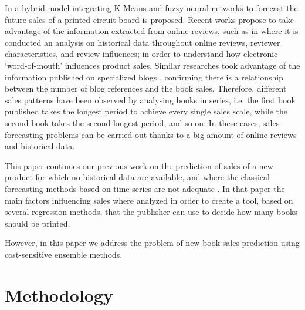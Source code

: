 \documentclass[a4paper,10pt,onecolumn,preprint,3p]{elsarticle}
\begin{document}
In \cite{Chang2009} a hybrid model integrating K-Means and fuzzy neural networks 
to forecast the future sales of a printed circuit board is proposed.
Recent works propose to take advantage of the information extracted from online reviews, such as in \cite{ChernWSF15} where it is conducted an analysis on historical data throughout online reviews, reviewer characteristics, and review influences; in order to understand how electronic `word-of-mouth' influences product sales.
Similar researches took advantage of the information published on specialized 
blogs \cite{Moon2010ICSSSM,Moon2010ICEC}, confirming there is a relationship between the number of blog references and the book sales. Therefore, different sales patterns have been observed by analysing books in series, i.e. the first book published takes the longest period to achieve every single sales scale, while the second book takes the second longest period, and so on.
In these cases, sales forecasting problems can be carried out thanks to a big 
amount of online reviews and historical data.


This paper continues our previous work on the prediction of sales of a new product for which no historical data are available, and where the classical forecasting methods based on time-series are not adequate \cite{Castillo2016books}. In that paper the main factors influencing sales where 
analyzed in order to create a tool, based on several regression methods, that the publisher can use to decide how many books should be printed.

However, in this paper we address the problem of new book sales prediction using cost-sensitive ensemble methods.

\section{Methodology}
\label{sec:methodology}
\end{document}
